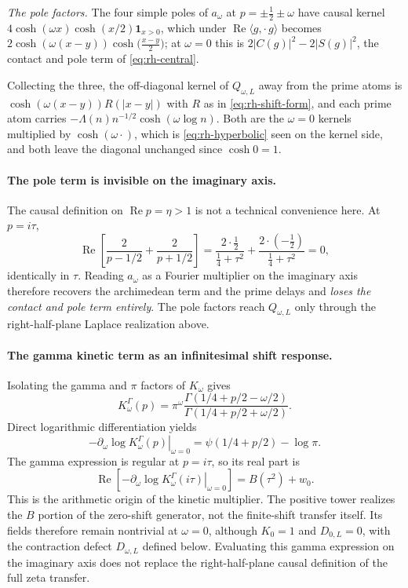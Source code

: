 \emph{The pole factors.} The four simple poles of $a_\omega$ at
$p=\pm\frac12\pm\omega$ have causal kernel
$4\cosh(\omega x)\cosh(x/2)\mathbf1_{x>0}$, which under
$\operatorname{Re}\langle g,\cdot\,g\rangle$ becomes
$2\cosh(\omega(x-y))\cosh\!\big(\frac{x-y}2\big)$; at $\omega=0$ this is
$2|C(g)|^2-2|S(g)|^2$, the contact and pole term of \eqref{eq:rh-central}.

Collecting the three, the off-diagonal kernel of $Q_{\omega,L}$ away from the
prime atoms is $\cosh(\omega(x-y))R(|x-y|)$ with $R$ as in
\eqref{eq:rh-shift-form}, and each prime atom carries
$-\Lambda(n)n^{-1/2}\cosh(\omega\log n)$. Both are the $\omega=0$ kernels
multiplied by $\cosh(\omega\cdot)$, which is \eqref{eq:rh-hyperbolic} seen on the
kernel side, and both leave the diagonal unchanged since $\cosh0=1$.

\paragraph{The pole term is invisible on the imaginary axis.}
The causal definition on $\operatorname{Re}p=\eta>1$ is not a technical
convenience here. At $p=i\tau$,
\[
\operatorname{Re}\left[\frac2{p-1/2}+\frac2{p+1/2}\right]
=\frac{2\cdot\frac12}{\frac14+\tau^2}+\frac{2\cdot(-\frac12)}{\frac14+\tau^2}=0 ,
\]
identically in $\tau$. Reading $a_\omega$ as a Fourier multiplier on the
imaginary axis therefore recovers the archimedean term and the prime delays and
\emph{loses the contact and pole term entirely}. The pole factors reach
$Q_{\omega,L}$ only through the right-half-plane Laplace realization above.

\paragraph{The gamma kinetic term as an infinitesimal shift response.}
Isolating the gamma and $\pi$ factors of $K_\omega$ gives
\[
K^\Gamma_\omega(p)
=\pi^\omega
\frac{\Gamma(1/4+p/2-\omega/2)}
     {\Gamma(1/4+p/2+\omega/2)}.
\]
Direct logarithmic differentiation yields
\[
-\left.\partial_\omega\log K^\Gamma_\omega(p)\right|_{\omega=0}
=\psi(1/4+p/2)-\log\pi.
\]
The gamma expression is regular at $p=i\tau$, so its real part is
\[
\operatorname{Re}\!\left[
-\left.\partial_\omega\log K^\Gamma_\omega(i\tau)\right|_{\omega=0}
\right]=B(\tau^2)+w_0.
\]
This is the arithmetic origin of the kinetic multiplier. The positive
tower realizes the $B$ portion of the zero-shift generator, not the
finite-shift transfer itself. Its fields therefore remain nontrivial
at $\omega=0$, although $K_0=1$ and $D_{0,L}=0$, with the contraction
defect $D_{\omega,L}$ defined below. Evaluating this gamma expression
on the imaginary axis does not replace the right-half-plane causal
definition of the full zeta transfer.

